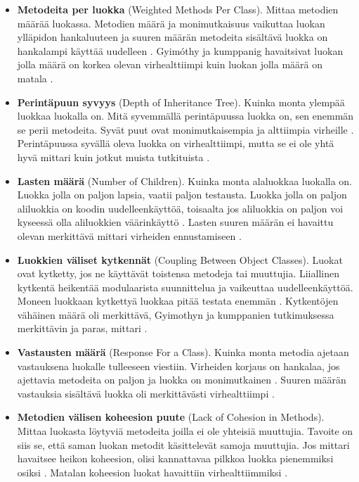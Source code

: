 \documentclass[finnish]{tktltiki2}
\theoremstyle{definition}
\theoremstyle{remark}
\begin{document}
\begin{itemize}

  \item \textbf{Metodeita per luokka} (Weighted Methods Per Class). Mittaa metodien määrää luokassa. Metodien määrä ja monimutkaisuus vaikuttaa luokan ylläpidon hankaluuteen ja suuren määrän metodeita sisältävä luokka on hankalampi käyttää uudelleen \cite{Chidamber94}. Gyimóthy ja kumppanig havaitsivat luokan jolla määrä on korkea olevan virhealttiimpi kuin luokan jolla määrä on matala \cite{Gyimothy05}.

  \item \textbf{Perintäpuun syvyys} (Depth of Inheritance Tree). Kuinka monta ylempää luokkaa luokalla on. Mitä syvemmällä perintäpuussa luokka on, sen enemmän se perii metodeita. Syvät puut ovat monimutkaisempia ja alttiimpia virheille \cite{Chidamber94}. Perintäpuussa syvällä oleva luokka on virhealttiimpi, mutta se ei ole yhtä hyvä mittari kuin jotkut muista tutkituista \cite{Gyimothy05}.

  \item \textbf{Lasten määrä} (Number of Children). Kuinka monta alaluokkaa luokalla on. Luokka jolla on paljon lapsia, vaatii paljon testausta. Luokka jolla on paljon aliluokkia on koodin uudelleenkäyttöä, toisaalta jos aliluokkia on paljon voi kyseessä olla aliluokkien väärinkäyttö \cite{Chidamber94}. Lasten suuren määrän ei havaittu olevan merkittävä mittari virheiden ennustamiseen \cite{Gyimothy05}.

  \item \textbf{Luokkien väliset kytkennät} (Coupling Between Object Classes). Luokat ovat kytketty, jos ne käyttävät toistensa metodeja tai muuttujia. Liiallinen kytkentä heikentää modulaarista suunnittelua ja vaikeuttaa uudelleenkäyttöä. Moneen luokkaan kytkettyä luokkaa pitää testata enemmän \cite{Chidamber94}. Kytkentöjen vähäinen määrä oli merkittävä, Gyimothyn ja kumppanien tutkimuksessa merkittävin ja paras, mittari \cite{Gyimothy05}.

  \item \textbf{Vastausten määrä} (Response For a Class). Kuinka monta metodia ajetaan vastauksena luokalle tulleeseen viestiin. Virheiden korjaus on hankalaa, jos ajettavia metodeita on paljon ja luokka on monimutkainen \cite{Chidamber94}. Suuren määrän vastauksia sisältävä luokka oli merkittävästi virhealttiimpi \cite{Gyimothy05}.

  \item \textbf{Metodien välisen koheesion puute} (Lack of Cohesion in Methods). Mittaa luokasta löytyviä metodeita joilla ei ole yhteisiä muuttujia. Tavoite on siis se, että saman luokan metodit käsittelevät samoja muuttujia. Jos mittari havaitsee heikon koheesion, olisi kannattavaa pilkkoa luokka pienemmiksi osiksi \cite{Chidamber94}. Matalan koheesion luokat havaittiin virhealttiimmiksi \cite{Gyimothy05}.


\end{itemize}
\end{document}
